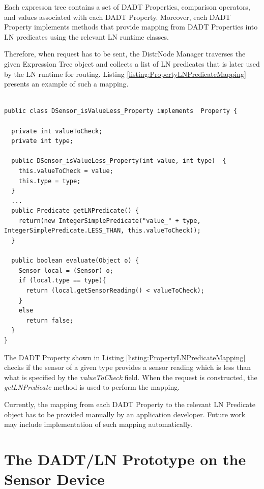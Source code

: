 Each expresson tree contains a set of DADT Properties, comparison operators,
and values associated with each DADT Property. Moreover,
each DADT Property implements methods that provide mapping from DADT
Properties into LN predicates using the relevant LN runtime classes. 

Therefore, when request has to be sent, the DistrNode Manager traverses
the given Expression Tree object and collects a list of LN predicates that
is later used by the LN runtime for routing. Listing
\ref{listing:PropertyLNPredicateMapping} presents an example of such a mapping.

\begin{lstlisting}[frame=trbl, basewidth={0.55em, 0.6em}, captionpos=b, 
basicstyle=\ttfamily\footnotesize, breaklines, caption = Mapping DADT Property to LN predicate  label = listing:PropertyLNPredicateMapping]

public class DSensor_isValueLess_Property implements  Property {

  private int valueToCheck;
  private int type;

  public DSensor_isValueLess_Property(int value, int type)  {
    this.valueToCheck = value;
    this.type = type;
  }
  ...
  public Predicate getLNPredicate() {
    return(new IntegerSimplePredicate("value_" + type, IntegerSimplePredicate.LESS_THAN, this.valueToCheck));
  }

  public boolean evaluate(Object o) {
    Sensor local = (Sensor) o;
    if (local.type == type){
      return (local.getSensorReading() < valueToCheck);	
    }
    else 
      return false;
  }
}
\end{lstlisting} 

The DADT Property shown in Listing \ref{listing:PropertyLNPredicateMapping}
checks if the sensor of a given type provides a sensor reading which is less
than what is specified by the \emph{valueToCheck} field. 
When the request is constructed, the \emph{getLNPredicate} method is used to
perform the mapping. 

Currently, the mapping from each DADT Property to the relevant LN Predicate
object has to be provided manually by an application developer.
Future work may include implementation of such mapping automatically.

\section{The DADT/LN Prototype on the Sensor Device} \label{subsubsec:DADTLNSensorDevice}

